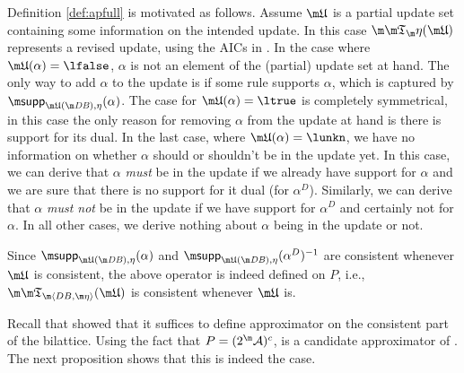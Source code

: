 Definition \ref{def:apfull} is motivated as follows. Assume $\UUU$ is a partial update set containing some information on the intended update. In this case $\Ap(\UUU)$ represents a revised update, using the AICs in \aics. 
In the case where $\UUU(\alpha)=\lfalse$, $\alpha$ is not an element of the (partial) update set at hand. The only way to add $\alpha$ to the update is if some rule supports $\alpha$, which is captured by $ \supp_{\UUU(\db),\eta}(\alpha)$. 
The case for $\UUU(\alpha)=\ltrue$ is completely symmetrical, in this case the only reason for removing $\alpha$ from the update at hand is there is support for its dual.
In the last case, where $\UUU(\alpha)=\lunkn$, we have no information on whether $\alpha$ should or shouldn't be in the update yet. In this case, we can derive that $\alpha$ \emph{must} be in the update if we already have support for $\alpha$ and we are sure that there is no support for it dual (for $\alpha^D$). Similarly, we can derive that $\alpha$ \emph{must not} be in the update if we have support for $\alpha^D$ and certainly not for $\alpha$.  
In all other cases, we derive nothing about $\alpha$ being in the update or not. 

Since $\supp_{\UUU(\db),\eta}(\alpha)$ and $\supp_{\UUU(\db),\eta}(\alpha^D)^{-1}$ are consistent whenever $\UUU$ is consistent, the above operator is indeed defined on $P$, i.e., $\Apfull(\UUU)$ is consistent whenever $\UUU$ is.

Recall that \citet{DeneckerMT04} showed that it suffices to define approximator on the consistent part of the bilattice. 
Using the fact that $P=(2^\acts)^c$, \Ap is a candidate approximator of \Op. The next proposition shows that this is indeed the case. 


